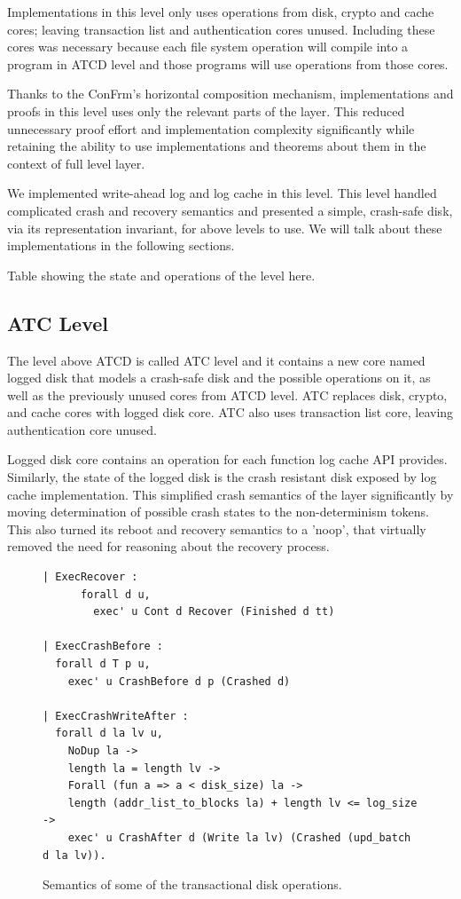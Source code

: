 Implementations in this level only uses operations from disk, crypto and cache cores; leaving transaction list and authentication cores unused. Including these cores was necessary because each file system operation will compile into a program in ATCD level and those programs will use operations from those cores. 

Thanks to the ConFrm's horizontal composition mechanism, implementations and proofs in this level uses only the relevant parts of the layer. This reduced unnecessary proof effort and implementation complexity significantly while retaining the ability to use implementations and theorems about them in the context of full level layer.

We implemented write-ahead log and log cache in this level. This level handled complicated crash and recovery semantics and presented a simple, crash-safe disk, via its representation invariant, for above levels to use. We will talk about these implementations in the following sections.


{\color{red} Table showing the state and operations of the level here}.

\subsection{ATC Level}
The level above ATCD is called ATC level and it contains a new core named logged disk that models a crash-safe disk and the possible operations on it, as well as the previously unused cores from ATCD level. ATC replaces disk, crypto, and cache cores with logged disk core. ATC also uses transaction list core, leaving authentication core unused.

Logged disk core contains an operation for each function log cache API provides. Similarly, the state of the logged disk is the crash resistant disk exposed by log cache implementation. This simplified crash semantics of the layer significantly by moving determination of possible crash states to the non-determinism tokens. This also turned its reboot and recovery semantics to a 'noop', that virtually removed the need for reasoning about the recovery process. 

\begin{figure}[H]
    \centering
\begin{verbatim}
| ExecRecover : 
      forall d u,
        exec' u Cont d Recover (Finished d tt)
        
| ExecCrashBefore :
  forall d T p u,
    exec' u CrashBefore d p (Crashed d)

| ExecCrashWriteAfter :
  forall d la lv u,
    NoDup la ->
    length la = length lv ->
    Forall (fun a => a < disk_size) la ->
    length (addr_list_to_blocks la) + length lv <= log_size ->
    exec' u CrashAfter d (Write la lv) (Crashed (upd_batch d la lv)).
\end{verbatim}
    \caption{Semantics of some of the transactional disk operations.}
    \label{fig:LD_Crash_Semantics}
\end{figure}

